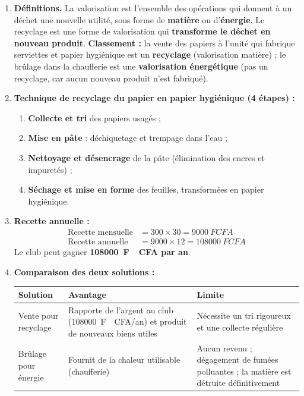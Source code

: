 \documentclass[11pt]{article}
\newcommand{\cle}[1]{{\popxbold\color{popdark}#1}}
\begin{document}
\begin{corrige}
\begin{enumerate}
\item \textbf{Définitions.} La \cle{valorisation} est l'ensemble des opérations qui donnent à un déchet une nouvelle utilité, sous forme de \textbf{matière} ou d'\textbf{énergie}. Le \cle{recyclage} est une forme de valorisation qui \textbf{transforme le déchet en nouveau produit}.
\textbf{Classement :} la vente des papiers à l'unité qui fabrique serviettes et papier hygiénique est un \textbf{recyclage} (valorisation matière) ; le brûlage dans la chaufferie est une \textbf{valorisation énergétique} (pas un recyclage, car aucun nouveau produit n'est fabriqué).
\item \textbf{Technique de recyclage du papier en papier hygiénique (4 étapes) :}
\begin{enumerate}
\item \textbf{Collecte et tri} des papiers usagés ;
\item \textbf{Mise en pâte} : déchiquetage et trempage dans l'eau ;
\item \textbf{Nettoyage et désencrage} de la pâte (élimination des encres et impuretés) ;
\item \textbf{Séchage et mise en forme} des feuilles, transformées en papier hygiénique.
\end{enumerate}
\item \textbf{Recette annuelle :}
\begin{align*}
\text{Recette mensuelle} &= 300 \times 30 = \SI{9000}{F\!CFA}\\
\text{Recette annuelle} &= 9000 \times 12 = \SI{108000}{F\!CFA}
\end{align*}
Le club peut gagner \textbf{\SI{108000}{F\!CFA} par an}.
\item \textbf{Comparaison des deux solutions :}
\begin{center}
\begin{tabularx}{\linewidth}{|l|X|X|}
\hline
\rowcolor{popblueL} \textbf{Solution} & \textbf{Avantage} & \textbf{Limite} \\
\hline
Vente pour recyclage & Rapporte de l'argent au club (\SI{108000}{F\!CFA}/an) et produit de nouveaux biens utiles & Nécessite un tri rigoureux et une collecte régulière \\
\hline
Brûlage pour énergie & Fournit de la chaleur utilisable (chaufferie) & Aucun revenu ; dégagement de fumées polluantes ; la matière est détruite définitivement \\

\end{tabularx}
\end{center}
\end{enumerate}
\end{corrige}
\end{document}
